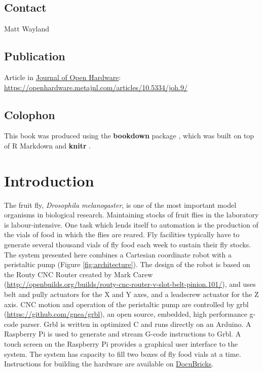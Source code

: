 \documentclass[
]{book}
\begin{document}
\hypertarget{contact}{%
\section*{Contact}\label{contact}}

Matt Wayland

\hypertarget{publication}{%
\section*{Publication}\label{publication}}

Article in \href{https://openhardware.metajnl.com/}{Journal of Open Hardware}:
\url{https://openhardware.metajnl.com/articles/10.5334/joh.9/}

\hypertarget{colophon}{%
\section*{Colophon}\label{colophon}}

This book was produced using the \textbf{bookdown} package \citep{R-bookdown}, which was built on top of R Markdown and \textbf{knitr} \citep{xie2015}.

\hypertarget{intro}{%
\chapter{Introduction}\label{intro}}

The fruit fly, \emph{Drosophila melanogaster}, is one of the most important model organisms in biological research. Maintaining stocks of fruit flies in the laboratory is labour-intensive. One task which lends itself to automation is the production of the vials of food in which the flies are reared. Fly facilities typically have to generate several thousand vials of fly food each week to sustain their fly stocks. The system presented here combines a Cartesian coordinate robot with a peristaltic pump (Figure \ref{fig:architecture}). The design of the robot is based on the Routy CNC Router created by Mark Carew (\url{http://openbuilds.org/builds/routy-cnc-router-v-slot-belt-pinion.101/}), and uses belt and pully actuators for the X and Y axes, and a leadscrew actuator for the Z axis. CNC motion and operation of the peristaltic pump are controlled by grbl (\url{https://github.com/gnea/grbl}), an open source, embedded, high performance g-code parser. Grbl is written in optimized C and runs directly on an Arduino. A Raspberry Pi is used to generate and stream G-code instructions to Grbl. A touch screen on the Raspberry Pi provides a graphical user interface to the system. The system has capacity to fill two boxes of fly food vials at a time. Instructions for building the hardware are available on \href{http://docubricks.com/viewer.jsp?id=8652757760093769728}{DocuBricks}.
\end{document}
